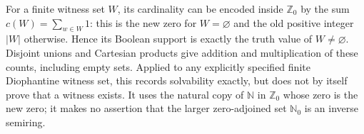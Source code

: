 For a finite witness set $W$, its cardinality can be encoded inside
$\mathbb Z_0$ by the sum $c(W)=\sum_{w\in W}1$: this is the new zero for
$W=\varnothing$ and the old positive integer $|W|$ otherwise. Hence its
Boolean support is exactly the truth value of $W\ne\varnothing$.
Disjoint unions and Cartesian products give addition and multiplication
of these counts, including empty sets. Applied to any explicitly
specified finite Diophantine witness set, this records solvability
exactly, but does not by itself prove that a witness exists. It uses the
natural copy of $\mathbb N$ in $\mathbb Z_0$ whose zero is the new zero;
it makes no assertion that the larger zero-adjoined set $\mathbb N_0$
is an inverse semiring.
